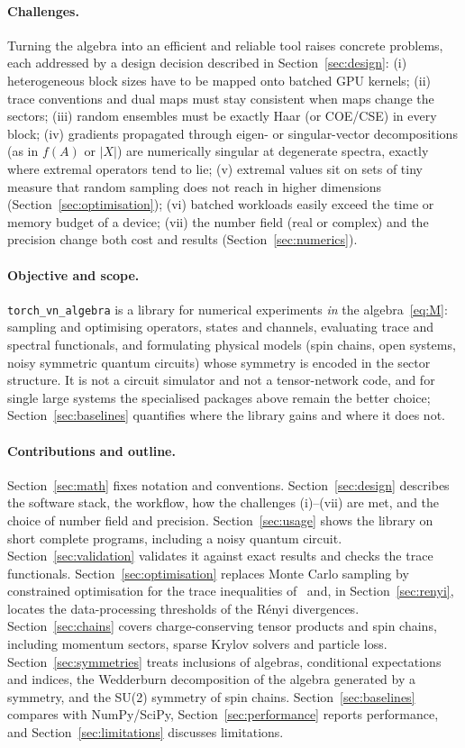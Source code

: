 \documentclass[11pt]{article}
\begin{document}
\paragraph{Challenges.} Turning the algebra into an efficient and reliable tool raises concrete problems, each
addressed by a design decision described in Section~\ref{sec:design}: (i) heterogeneous block sizes have to be
mapped onto batched GPU kernels; (ii) trace conventions and dual maps must stay consistent when maps change the
sectors; (iii) random ensembles must be exactly Haar (or COE/CSE) in every block; (iv) gradients propagated through
eigen- or singular-vector decompositions (as in $f(A)$ or $|X|$) are numerically singular at degenerate spectra,
exactly where extremal operators tend to lie; (v) extremal
values sit on sets of tiny measure that random sampling does not reach in higher dimensions
(Section~\ref{sec:optimisation}); (vi) batched workloads easily exceed the time or memory budget of a device;
(vii) the number field (real or complex) and the precision change both cost and results
(Section~\ref{sec:numerics}).

\paragraph{Objective and scope.} \texttt{torch\_vn\_algebra} is a library for numerical experiments \emph{in}
the algebra~\eqref{eq:M}: sampling and optimising operators, states and channels, evaluating trace and spectral
functionals, and formulating physical models (spin chains, open systems, noisy symmetric quantum circuits) whose
symmetry is encoded in the sector structure. It is not a circuit simulator and not a tensor-network code, and for
single large systems the specialised packages above remain the better choice; Section~\ref{sec:baselines}
quantifies where the library gains and where it does not.

\paragraph{Contributions and outline.} Section~\ref{sec:math} fixes notation and conventions. Section~\ref{sec:design}
describes the software stack, the workflow, how the challenges (i)--(vii) are met, and the choice of number field and
precision. Section~\ref{sec:usage} shows the library on short complete programs, including a noisy quantum circuit.
Section~\ref{sec:validation} validates it against exact results and checks the trace functionals.
Section~\ref{sec:optimisation} replaces Monte Carlo sampling by constrained optimisation for the trace inequalities
of~\cite{v1} and, in Section~\ref{sec:renyi}, locates the data-processing thresholds of the Rényi divergences.
Section~\ref{sec:chains} covers charge-conserving tensor products and spin chains, including momentum
sectors, sparse Krylov solvers and particle loss. Section~\ref{sec:symmetries} treats inclusions of algebras,
conditional expectations and indices, the Wedderburn decomposition of the algebra generated by a symmetry, and the
SU(2) symmetry of spin chains. Section~\ref{sec:baselines} compares with NumPy/SciPy,
Section~\ref{sec:performance} reports performance, and Section~\ref{sec:limitations} discusses limitations.
\end{document}
